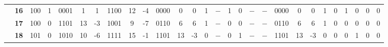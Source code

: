 \begin{figure}[H]
\begin{tcolorbox}[left=5mm,right=5mm,top=0mm,bottom=5mm,boxsep=0mm,
toptitle=0.5mm,bottomtitle=0.5mm,title=Resultados Teóricos \textit{versus} Resultados Experimentais,center title]
\begin{minipage}{\textwidth}
{\begin{tabular}{c|c|c|c|c|c|c|c|c|c|c|c|c|c|c|c|c|c|c|c|c|c|c|c|c|c|c|c|}
\cline{2-28}
                                                                                                           & \textbf{16}          & 100                  & 1                    & 0001                 & 1                                           & 1                                           & 1100                 & 12                                          & -4                                          & 0000                 & 0                                           & 0                                           & 1                    & $-$                    & 1                    & 0                    & $-$                    & $-$                    & 0000                 & 0                                           & 0                                           & 1                    & 0                    & 1                    & 0                    & 0                    & 0                     \\ 
\cline{2-28}
                                                                                                           & \textbf{17}          & 100                  & 0                    & 1101                 & 13                                          & -3                                          & 1001                 & 9                                           & -7                                          & 0110                 & 6                                           & 6                                           & 1                    & $-$                    & 0                    & 0                    & $-$                    & $-$                    & 0110                 & 6                                           & 6                                           & 1                    & 0                    & 0                    & 0                    & 0                    & 0                     \\ 
\cline{2-28}
                                                                                                           & \textbf{18}          & 101                  & 0                    & 1010                 & 10                                          & -6                                          & 1111                 & 15                                          & -1                                          & 1101                 & 13                                          & -3                                          & 0                    & $-$                    & 0                    & 1                    & $-$                    & $-$                    & 1101                 & 13                                          & -3                                          & 0                    & 0                    & 0                    & 1                    & 0                    & 0                     \\ 

\end{tabular}}
\end{minipage}
\end{tcolorbox}
\end{figure}
